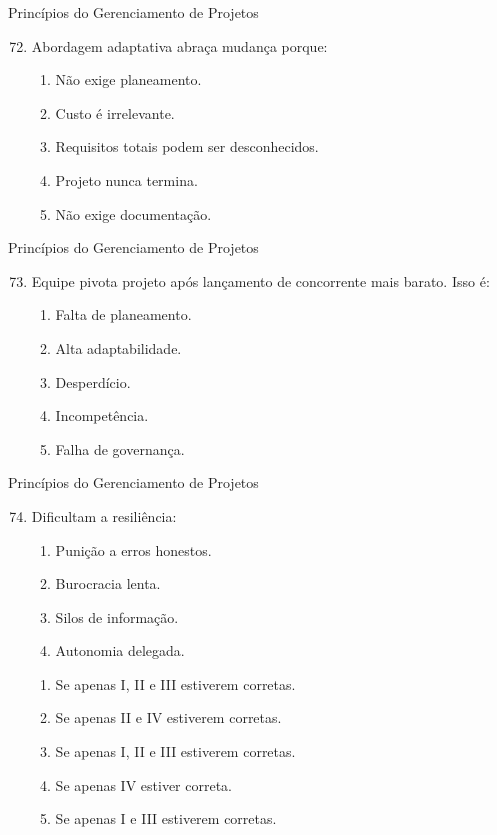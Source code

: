 \documentclass{beamer}
\begin{document}
\begin{frame}{Princípios do Gerenciamento de Projetos}
	\begin{enumerate}
		\setcounter{enumi}{71}
		\justifying
		\item Abordagem adaptativa abraça mudança porque:
		\begin{enumerate}[a]
			\item Não exige planeamento.
			\item Custo é irrelevante.
			\item \alert<2>{Requisitos totais podem ser desconhecidos.}
			\item Projeto nunca termina.
			\item Não exige documentação.
		\end{enumerate}
	\end{enumerate}
\end{frame}

\begin{frame}{Princípios do Gerenciamento de Projetos}
	\begin{enumerate}
		\setcounter{enumi}{72}
		\justifying
		\item Equipe pivota projeto após lançamento de concorrente mais barato. Isso é:
		\begin{enumerate}[a]
			\item Falta de planeamento.
			\item \alert<2>{Alta adaptabilidade.}
			\item Desperdício.
			\item Incompetência.
			\item Falha de governança.
		\end{enumerate}
	\end{enumerate}
\end{frame}

\begin{frame}{Princípios do Gerenciamento de Projetos}
	\begin{enumerate}
		\setcounter{enumi}{73}
		\justifying
		\item Dificultam a resiliência:
		\begin{enumerate}[I]
			\item Punição a erros honestos.
			\item Burocracia lenta.
			\item Silos de informação.
			\item Autonomia delegada.
		\end{enumerate}
		\begin{enumerate}[a]
			\item Se apenas I, II e III estiverem corretas.
			\item Se apenas II e IV estiverem corretas.
			\item \alert<2>{Se apenas I, II e III estiverem corretas.}
			\item Se apenas IV estiver correta.
			\item Se apenas I e III estiverem corretas.
		\end{enumerate}
	\end{enumerate}
\end{frame}
\end{document}

